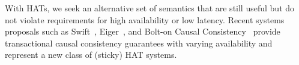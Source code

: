 With HATs, we seek an alternative set of semantics that are still
useful but do not violate requirements for high availability or low
latency. Recent systems proposals such as Swift~\cite{swift},
Eiger~\cite{eiger}, and Bolt-on Causal Consistency~\cite{bolton}
provide transactional causal consistency guarantees with varying
availability and represent a new class of (sticky) HAT
systems. 








